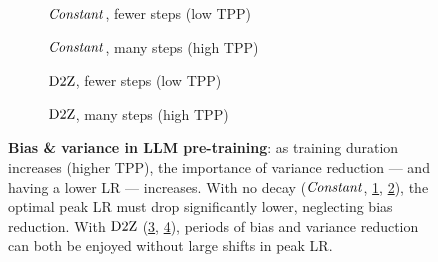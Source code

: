 \begin{figure}[th]
\centering

\begin{subfigure}[t]{0.32\textwidth}
  \centering

\vspace{-0.1cm}
\caption{$\mbox{\emph{Constant}}$, fewer steps (low TPP)\label{fig:const_low}}
\end{subfigure}%
\hfill
\begin{subfigure}[t]{0.65\textwidth}
  \centering

\vspace{-0.1cm}
\caption{$\mbox{\emph{Constant}}$, many steps (high TPP)\label{fig:const_high}}
\end{subfigure}

\vspace{0.2cm} %

\noindent

\begin{subfigure}[t]{0.32\textwidth}
  \centering

\vspace{-0.1cm}
\caption{$\mbox{D2Z}$, fewer steps (low TPP)\label{fig:dtoz_low}}
\end{subfigure}%
\hfill
\begin{subfigure}[t]{0.65\textwidth}
  \centering

\vspace{-0.1cm}
\caption{$\mbox{D2Z}$, many steps (high TPP)\label{fig:dtoz_high}}
\end{subfigure}

\caption{\textbf{Bias \& variance in LLM pre-training}: as training
  duration increases (higher TPP), the importance of variance
  reduction --- and having a lower LR --- increases.  With no decay
  ($\mbox{\emph{Constant}}$, \ref{fig:const_low}, \ref{fig:const_high}), the
  optimal peak LR must drop significantly lower, neglecting bias
  reduction.  With $\mbox{D2Z}$ (\ref{fig:dtoz_low}, \ref{fig:dtoz_high}),
  periods of bias and variance reduction can both be enjoyed without
  large shifts in peak LR.\label{fig:bias_var_all}}
\end{figure}
